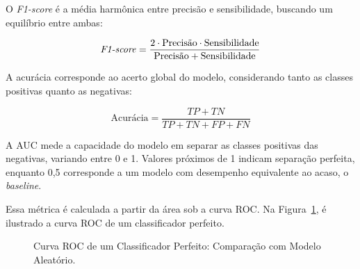 O \textit{F1-score} é a média harmônica entre precisão e sensibilidade, buscando um equilíbrio entre ambas:

\begin{equation}
\text{\textit{F1-score}} = \frac{2 \cdot \text{Precisão} \cdot \text{Sensibilidade}}{\text{Precisão} + \text{Sensibilidade}}
\end{equation}

A acurácia corresponde ao acerto global do modelo, considerando tanto as classes positivas quanto as negativas:

\begin{equation}
\text{Acurácia} = \frac{TP + TN}{TP + TN + FP + FN}
\end{equation}

A AUC mede a capacidade do modelo em separar as classes positivas das negativas, variando entre 0 e 1. Valores próximos de 1 indicam separação perfeita, enquanto 0,5 corresponde a um modelo com desempenho equivalente ao acaso,
o \textit{baseline}.

Essa métrica é calculada a partir da área sob a curva ROC. Na Figura~\ref{fig:roc_perfect}, é ilustrado a curva ROC de um classificador perfeito.

\begin{figure}[H]
    \centering
    \caption{Curva ROC de um Classificador Perfeito: Comparação com Modelo Aleatório.}
    \label{fig:roc_perfect}
\end{figure}

